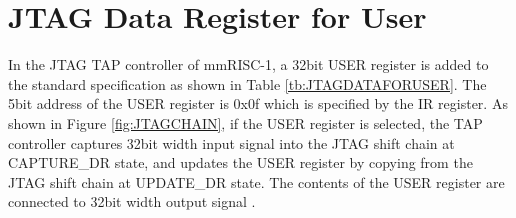 \section{JTAG Data Register for User}
\label{sec:JTAGDataForUSer}

In the JTAG TAP controller of mmRISC-1, a 32bit USER register is added to the standard specification as shown in Table \ref{tb:JTAGDATAFORUSER}. The 5bit address of the USER register is 0x0f which is specified by the IR register. As shown in Figure \ref{fig:JTAGCHAIN}, if the USER register is selected, the TAP controller captures 32bit width input signal  into the JTAG shift chain at CAPTURE\_DR state, and updates the USER register by copying from the JTAG shift chain at UPDATE\_DR state. The contents of the USER register are connected to 32bit width output signal . \\


